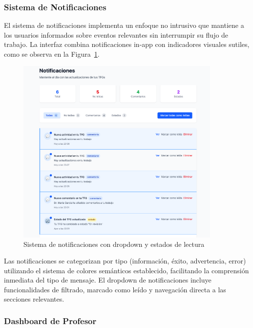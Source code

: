 \documentclass[12pt,a4paper,oneside]{report}
\begin{document}
\subsubsection{Sistema de Notificaciones}\label{sistema-de-notificaciones}

El sistema de notificaciones implementa un enfoque no intrusivo que mantiene a los usuarios informados sobre eventos relevantes sin interrumpir su flujo de trabajo. La interfaz combina notificaciones in-app con indicadores visuales sutiles, como se observa en la Figura~\ref{fig:sistema-notificaciones}.

\begin{figure}[H]
\centering
\includegraphics[width=0.9\textwidth]{processed/images/sistema_notificaciones.png}
\caption{Sistema de notificaciones con dropdown y estados de lectura}
\label{fig:sistema-notificaciones}
\end{figure}

Las notificaciones se categorizan por tipo (información, éxito, advertencia, error) utilizando el sistema de colores semánticos establecido, facilitando la comprensión inmediata del tipo de mensaje. El dropdown de notificaciones incluye funcionalidades de filtrado, marcado como leído y navegación directa a las secciones relevantes.

\subsubsection{Dashboard de Profesor}\label{dashboard-de-profesor}
\end{document}
